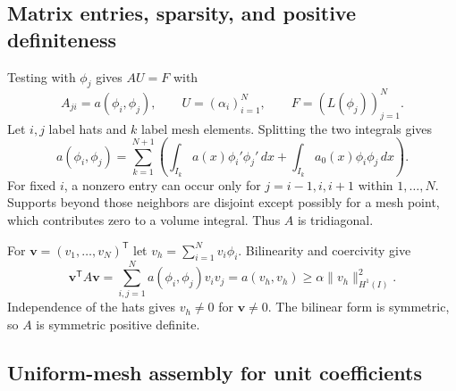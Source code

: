 \documentclass[11pt,a4paper]{article}
\begin{document}
\subsection{Matrix entries, sparsity, and positive definiteness}

Testing with \(\phi_j\) gives \(AU=F\) with
\[
 A_{ji}=a(\phi_i,\phi_j),\qquad U=(\alpha_i)_{i=1}^N,\qquad
 F=(L(\phi_j))_{j=1}^N.
\]
Let \(i,j\) label hats and \(k\) label mesh elements. Splitting the two
integrals gives
\[
 a(\phi_i,\phi_j)
 =\sum_{k=1}^{N+1}\left(
   \int_{I_k}a(x)\phi_i'\phi_j'\,dx+
   \int_{I_k}a_0(x)\phi_i\phi_j\,dx
 \right).
\]
For fixed \(i\), a nonzero entry can occur only for \(j=i-1,i,i+1\)
within \(1,\ldots,N\). Supports beyond those neighbors are disjoint
except possibly for a mesh point, which contributes zero to a volume
integral. Thus \(A\) is tridiagonal.

For \(\mathbf v=(v_1,\ldots,v_N)^{\mathsf T}\) let
\(v_h=\sum_{i=1}^Nv_i\phi_i\). Bilinearity and coercivity give
\[
 \mathbf v^{\mathsf T}A\mathbf v
 =\sum_{i,j=1}^N a(\phi_i,\phi_j)v_iv_j
 =a(v_h,v_h)\ge\alpha\|v_h\|_{H^1(I)}^2 .
\]
Independence of the hats gives \(v_h\ne0\) for \(\mathbf v\ne0\).
The bilinear form is symmetric, so \(A\) is symmetric positive definite.

\subsection{Uniform-mesh assembly for unit coefficients}
\end{document}
